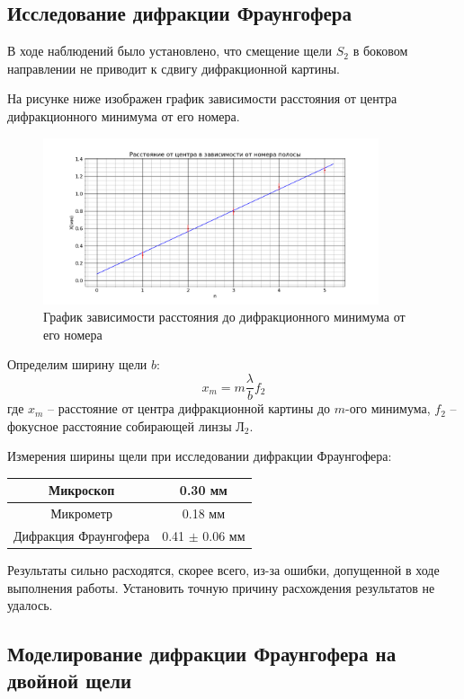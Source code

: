 \subsection*{Исследование дифракции Фраунгофера}

В ходе наблюдений было установлено, что смещение щели $S_2$ в боковом 
направлении не приводит к сдвигу дифракционной картины.

На рисунке ниже изображен график зависимости расстояния от центра 
дифракционного минимума от его номера.

\begin{figure}[H]
	\centering
	\includegraphics[width=0.88\textwidth]{../Изображения/X_n.png}
	\caption{График зависимости расстояния до дифракционного минимума от его 
	номера}
\end{figure}

Определим ширину щели $b$:
$$
x_m = m \frac{\lambda}{b} f_2
$$
где $x_m$ -- расстояние от центра дифракционной картины до $m$-ого минимума, 
$f_2$ -- фокусное расстояние собирающей линзы $Л_2$.

Измерения ширины щели при исследовании дифракции Фраунгофера:\\

\begin{tabular}{|c|c|}
	\hline
	Микроскоп & 0.30 мм \\
	\hline
	Микрометр & 0.18 мм \\
	\hline
	Дифракция Фраунгофера & 0.41 $\pm$ 0.06 мм \\
	\hline
\end{tabular}

Результаты сильно расходятся, скорее всего, из-за ошибки, допущенной в ходе 
выполнения работы. Установить точную причину расхождения результатов не удалось.

\subsection*{Моделирование дифракции Фраунгофера на двойной щели}

